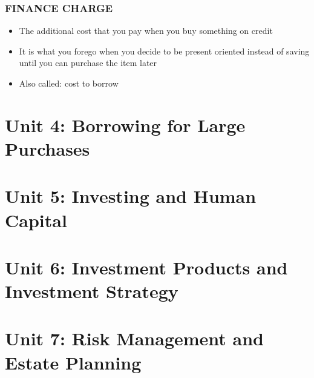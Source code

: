 \documentclass[12pt]{article}
\begin{document}
                \subsubsection{FINANCE CHARGE}
                    \begin{itemize}
                        \item The additional cost that you pay when you buy something on credit
                        \item It is what you forego when you decide to be present oriented instead of saving until you can purchase the item later
                        \item Also called: cost to borrow
                    \end{itemize}

    \section{Unit 4: Borrowing for Large Purchases}

    \section{Unit 5: Investing and Human Capital}
    
    \section{Unit 6: Investment Products and Investment Strategy}

    \section{Unit 7: Risk Management and Estate Planning}
    
\end{document}

